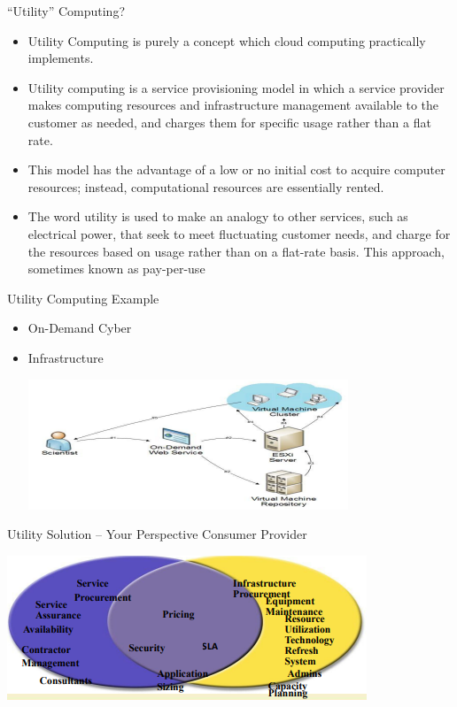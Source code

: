 \documentclass{SKP-beamer}
\begin{document}
\begin{frame}{“Utility” Computing?}
	\begin{itemize}
		
		\item Utility Computing is purely a concept which cloud computing practically implements.
		\item Utility computing is a service provisioning model in which a service provider makes 
		computing resources and infrastructure management available to the customer as 
		needed, and charges them for specific usage rather than a flat rate.
		\item This model has the advantage of a low or no initial cost to acquire computer resources; 
		instead, computational resources are essentially rented.
		\item The word utility is used to make an analogy to other services, such as electrical power, 
		that seek to meet fluctuating customer needs, and charge for the resources based on 
		usage rather than on a flat-rate basis. This approach, sometimes known as pay-per-use
		
		
	\end{itemize}
\end{frame}



\begin{frame}{Utility Computing Example}
	\begin{itemize}
		
		\item On-Demand Cyber
		\item Infrastructure
		
			\includegraphics[scale=1.5]{9.png}
		
		
		
	\end{itemize}
\end{frame}

\begin{frame}{Utility Solution – Your 
		Perspective Consumer Provider}
	
		
		\includegraphics[scale=1.5]{10.png}
		
		
		

\end{frame}
\end{document}

